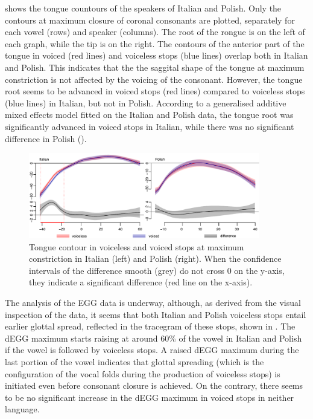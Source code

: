 \documentclass[11pt,A4paper,]{article}
\begin{document}
 shows the tongue countours of the speakers of Italian
and Polish. Only the contours at maximum closure of coronal consonants
are plotted, separately for each vowel (rows) and speaker (columns). The
root of the rongue is on the left of each graph, while the tip is on the
right. The contours of the anterior part of the tongue in voiced (red
lines) and voiceless stops (blue lines) overlap both in Italian and
Polish. This indicates that the the saggital shape of the tongue at
maximum constriction is not affected by the voicing of the consonant.
However, the tongue root seems to be advanced in voiced stops (red
lines) compared to voiceless stops (blue lines) in Italian, but not in
Polish. According to a generalised additive mixed effects model fitted
on the Italian and Polish data, the tongue root was significantly
advanced in voiced stops in Italian, while there was no significant
difference in Polish ().

\begin{figure}[htbp]
\centering
\includegraphics[width=0.90000\textwidth]{../graphics/it-pl.pdf}
\caption{Tongue contour in voiceless and voiced stops at maximum
constriction in Italian (left) and Polish (right). When the confidence
intervals of the difference smooth (grey) do not cross 0 on the y-axis,
they indicate a significant difference (red line on the
x-axis).\label{f:it-pl}}
\end{figure}

The analysis of the EGG data is underway, although, as derived from the
visual inspection of the data, it seems that both Italian and Polish
voiceless stops entail earlier glottal spread, reflected in the
tracegram of these stops, shown in . The dEGG maximum
starts raising at around 60\% of the vowel in Italian and Polish if the
vowel is followed by voiceless stops. A raised dEGG maximum during the
last portion of the vowel indicates that glottal spreading (which is the
configuration of the vocal folds during the production of voiceless
stops) is initiated even before consonant closure is achieved. On the
contrary, there seems to be no significant increase in the dEGG maximum
in voiced stops in neither language.
\end{document}
